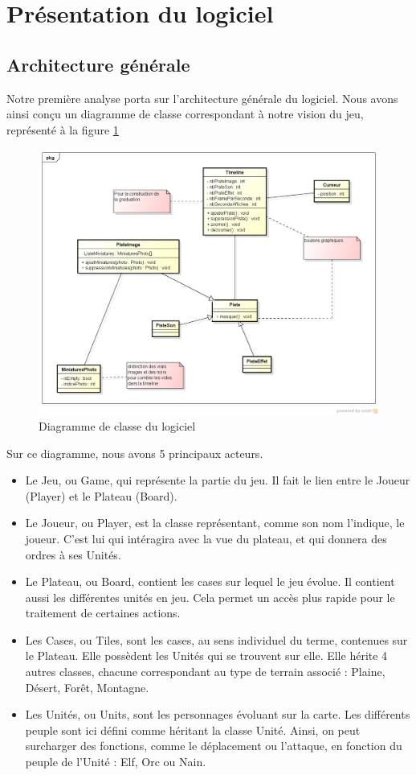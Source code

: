 \documentclass[12pt]{article}
\begin{document}
\section{Présentation du logiciel}

\subsection{Architecture générale}
Notre première analyse porta sur l'architecture générale du logiciel. Nous avons ainsi conçu un diagramme de classe correspondant à notre vision du jeu, représenté à la figure \ref{classe}

\begin{figure}[!h] 
\centerline{\includegraphics[scale=0.60]{diag_class_ex.png}}
   \caption{\label{étiquette} Diagramme de classe du logiciel}
\label{classe}
\end{figure}

Sur ce diagramme, nous avons 5 principaux acteurs.
\begin{itemize}
  \item Le Jeu, ou Game, qui représente la partie du jeu. Il fait le lien entre le Joueur (Player) et le Plateau (Board). 
  \item Le Joueur, ou Player, est la classe représentant, comme son nom l'indique, le joueur. C'est lui qui intéragira avec la vue du plateau, et qui donnera des ordres à ses Unités.
  \item Le Plateau, ou Board, contient les cases sur lequel le jeu évolue. Il contient aussi les différentes unités en jeu. Cela permet un accès plus rapide pour le traitement de certaines actions.
  \item Les Cases, ou Tiles, sont les cases, au sens individuel du terme, contenues sur le Plateau. Elle possèdent les Unités qui se trouvent sur elle. Elle hérite 4 autres classes, chacune correspondant au type de terrain associé : Plaine, Désert, Forêt, Montagne.
  \item Les Unités, ou Units, sont les personnages évoluant sur la carte. Les différents peuple sont ici défini comme héritant la classe Unité. Ainsi, on peut surcharger des fonctions, comme le déplacement ou l'attaque, en fonction du peuple de l'Unité : Elf, Orc ou Nain.
\end{itemize}
\end{document}
